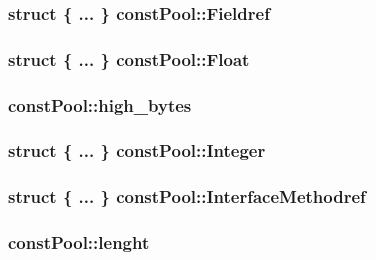 \subsubsection[{Fieldref}]{\setlength{\rightskip}{0pt plus 5cm}struct \{ ... \}   const\+Pool\+::\+Fieldref}\label{structconst_pool_a2d445b84752ddea1db4ef9f3ce2fee02}
\hypertarget{structconst_pool_aaba15c27d5b0f572a54d68643aa577fa}{}
\subsubsection[{Float}]{\setlength{\rightskip}{0pt plus 5cm}struct \{ ... \}   const\+Pool\+::\+Float}\label{structconst_pool_aaba15c27d5b0f572a54d68643aa577fa}
\hypertarget{structconst_pool_a5c4154d878bdc78c47829c3003008bcd}{}
\subsubsection[{high\+\_\+bytes}]{ const\+Pool\+::high\+\_\+bytes}\label{structconst_pool_a5c4154d878bdc78c47829c3003008bcd}
\hypertarget{structconst_pool_ae32ce70f2995b3b811d6ae719d62c6ef}{}
\subsubsection[{Integer}]{\setlength{\rightskip}{0pt plus 5cm}struct \{ ... \}   const\+Pool\+::\+Integer}\label{structconst_pool_ae32ce70f2995b3b811d6ae719d62c6ef}
\hypertarget{structconst_pool_aba9741376f8030471992d6b68fb4142b}{}
\subsubsection[{Interface\+Methodref}]{\setlength{\rightskip}{0pt plus 5cm}struct \{ ... \}   const\+Pool\+::\+Interface\+Methodref}\label{structconst_pool_aba9741376f8030471992d6b68fb4142b}
\hypertarget{structconst_pool_addff2c24e88a3e8686a219fe6a9bbcd3}{}
\subsubsection[{lenght}]{ const\+Pool\+::lenght}\label{structconst_pool_addff2c24e88a3e8686a219fe6a9bbcd3}
\hypertarget{structconst_pool_a2ff4c34ed23a88cc0e355b0111ce8957}{}
